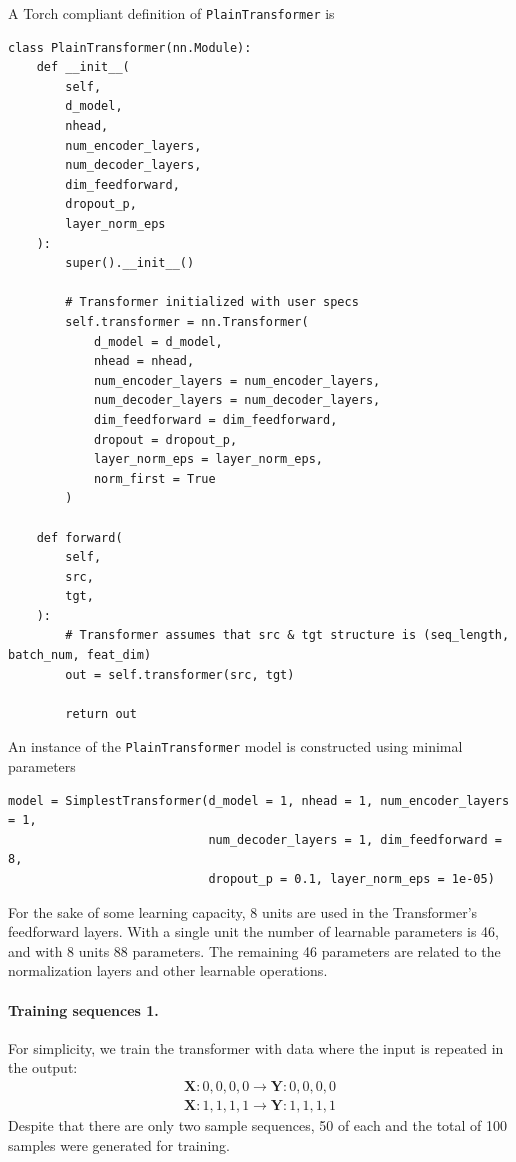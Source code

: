 \documentclass[final]{article}
\begin{document}
A Torch compliant definition of \texttt{PlainTransformer} is
\begin{lstlisting}
class PlainTransformer(nn.Module):
    def __init__(
        self,
        d_model,
        nhead,
        num_encoder_layers,
        num_decoder_layers,
        dim_feedforward,
        dropout_p,
        layer_norm_eps
    ):
        super().__init__()

        # Transformer initialized with user specs
        self.transformer = nn.Transformer(
            d_model = d_model,
            nhead = nhead,
            num_encoder_layers = num_encoder_layers,
            num_decoder_layers = num_decoder_layers,
            dim_feedforward = dim_feedforward,
            dropout = dropout_p,
            layer_norm_eps = layer_norm_eps,
            norm_first = True
        )

    def forward(
        self,
        src,
        tgt,
    ):
        # Transformer assumes that src & tgt structure is (seq_length, batch_num, feat_dim)
        out = self.transformer(src, tgt)

        return out
\end{lstlisting}

An instance of the \texttt{PlainTransformer} model is constructed
using minimal parameters
\begin{lstlisting}
model = SimplestTransformer(d_model = 1, nhead = 1, num_encoder_layers = 1,
                            num_decoder_layers = 1, dim_feedforward = 8,
                            dropout_p = 0.1, layer_norm_eps = 1e-05)
\end{lstlisting}
For the sake of some learning capacity, 8 units are used in the
Transformer's feedforward layers. With a single unit the number of
learnable parameters is 46, and with 8 units 88 parameters. The
remaining 46 parameters are related to the normalization layers and
other learnable operations.

\paragraph{Training sequences 1.} For simplicity, we train the
transformer with data where the input is repeated in the output:
\begin{displaymath}
  \begin{split}
    \mathbf{X}: 0,0,0,0 \rightarrow \mathbf{Y}: 0,0,0,0\\
    \mathbf{X}: 1,1,1,1 \rightarrow \mathbf{Y}: 1,1,1,1
  \end{split}
\end{displaymath}
Despite that there are only two sample sequences, 50 of each and the total of
100 samples were generated for training.
\end{document}
